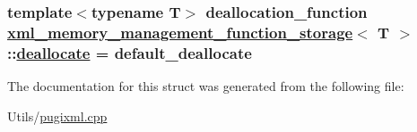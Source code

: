 \hypertarget{structxml__memory__management__function__storage_1c80a9a045ed6cfb90b17a178e4b3512}{
\subsubsection[deallocate]{\setlength{\rightskip}{0pt plus 5cm}template$<$typename T$>$ deallocation\_\-function \hyperlink{structxml__memory__management__function__storage}{xml\_\-memory\_\-management\_\-function\_\-storage}$<$ T $>$::\hyperlink{structxml__memory__management__function__storage_1c80a9a045ed6cfb90b17a178e4b3512}{deallocate} = default\_\-deallocate}}
\label{structxml__memory__management__function__storage_1c80a9a045ed6cfb90b17a178e4b3512}




The documentation for this struct was generated from the following file:\begin{CompactItemize}
\item 
Utils/\hyperlink{pugixml_8cpp}{pugixml.cpp}\end{CompactItemize}
